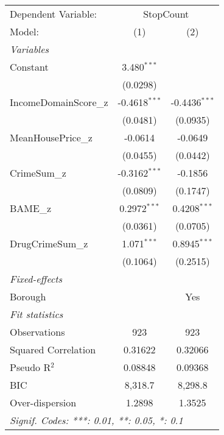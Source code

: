 
\begingroup
\centering
\begin{tabular}{lcc}
   \tabularnewline \midrule \midrule
   Dependent Variable: & \multicolumn{2}{c}{StopCount}\\
   Model:                & (1)             & (2)\\  
   \midrule
   \emph{Variables}\\
   Constant              & 3.480$^{***}$   &   \\   
                         & (0.0298)        &   \\   
   IncomeDomainScore\_z  & -0.4618$^{***}$ & -0.4436$^{***}$\\   
                         & (0.0481)        & (0.0935)\\   
   MeanHousePrice\_z     & -0.0614         & -0.0649\\   
                         & (0.0455)        & (0.0442)\\   
   CrimeSum\_z           & -0.3162$^{***}$ & -0.1856\\   
                         & (0.0809)        & (0.1747)\\   
   BAME\_z               & 0.2972$^{***}$  & 0.4208$^{***}$\\   
                         & (0.0361)        & (0.0705)\\   
   DrugCrimeSum\_z       & 1.071$^{***}$   & 0.8945$^{***}$\\   
                         & (0.1064)        & (0.2515)\\   
   \midrule
   \emph{Fixed-effects}\\
   Borough               &                 & Yes\\  
   \midrule
   \emph{Fit statistics}\\
   Observations          & 923             & 923\\  
   Squared Correlation   & 0.31622         & 0.32066\\  
   Pseudo R$^2$          & 0.08848         & 0.09368\\  
   BIC                   & 8,318.7         & 8,298.8\\  
   Over-dispersion       & 1.2898          & 1.3525\\  
   \midrule \midrule
   \multicolumn{3}{l}{\emph{Signif. Codes: ***: 0.01, **: 0.05, *: 0.1}}\\
\end{tabular}
\par\endgroup


